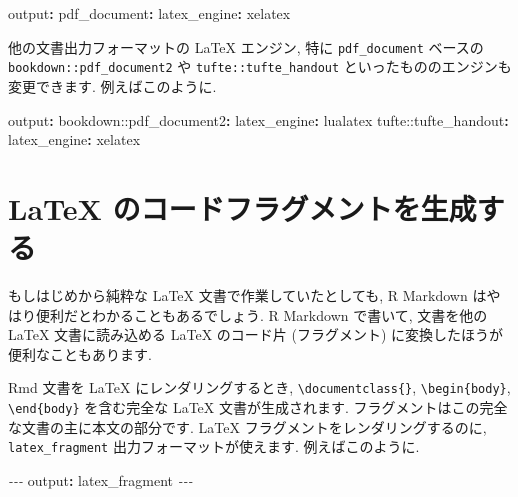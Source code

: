 \documentclass[
  11pt,
  lualatex,
  ja=standard]{bxjsreport}
\newenvironment{Shaded}{\begin{snugshade}}{\end{snugshade}}
\newcommand{\AttributeTok}[1]{\textcolor[rgb]{0.77,0.63,0.00}{#1}}
\newcommand{\FunctionTok}[1]{\textcolor[rgb]{0.00,0.00,0.00}{#1}}
\newcommand{\KeywordTok}[1]{\textcolor[rgb]{0.13,0.29,0.53}{\textbf{#1}}}
\newcommand{\PreprocessorTok}[1]{\textcolor[rgb]{0.56,0.35,0.01}{\textit{#1}}}
\begin{document}
\begin{Shaded}
\begin{Highlighting}[]
\FunctionTok{output}\KeywordTok{:}
\AttributeTok{  }\FunctionTok{pdf\_document}\KeywordTok{:}
\AttributeTok{    }\FunctionTok{latex\_engine}\KeywordTok{:}\AttributeTok{ xelatex}
\end{Highlighting}
\end{Shaded}

他の文書出力フォーマットの LaTeX エンジン, 特に \texttt{pdf\_document} ベースの \texttt{bookdown::pdf\_document2} や \texttt{tufte::tufte\_handout} といったもののエンジンも変更できます. 例えばこのように.

\begin{Shaded}
\begin{Highlighting}[]
\FunctionTok{output}\KeywordTok{:}
\AttributeTok{  bookdown::pdf\_document2}\KeywordTok{:}\FunctionTok{}
\AttributeTok{    }\FunctionTok{latex\_engine}\KeywordTok{:}\AttributeTok{ lualatex}
\AttributeTok{  tufte::tufte\_handout}\KeywordTok{:}\FunctionTok{}
\AttributeTok{    }\FunctionTok{latex\_engine}\KeywordTok{:}\AttributeTok{ xelatex}
\end{Highlighting}
\end{Shaded}

\hypertarget{latex-fragment}{%
\section{LaTeX のコードフラグメントを生成する}\label{latex-fragment}}

もしはじめから純粋な LaTeX 文書で作業していたとしても, R Markdown はやはり便利だとわかることもあるでしょう. R Markdown で書いて, 文書を他の LaTeX 文書に読み込める LaTeX のコード片 (フラグメント) に変換したほうが便利なこともあります.

Rmd 文書を LaTeX にレンダリングするとき, \texttt{\textbackslash{}documentclass\{\}}, \texttt{\textbackslash{}begin\{body\}}, \texttt{\textbackslash{}end\{body\}} を含む完全な LaTeX 文書が生成されます. フラグメントはこの完全な文書の主に本文の部分です. LaTeX フラグメントをレンダリングするのに, \texttt{latex\_fragment} 出力フォーマットが使えます. 例えばこのように.

\begin{Shaded}
\begin{Highlighting}[]
\PreprocessorTok{{-}{-}{-}}
\FunctionTok{output}\KeywordTok{:}\AttributeTok{ latex\_fragment}
\PreprocessorTok{{-}{-}{-}}
\end{Highlighting}
\end{Shaded}
\end{document}
